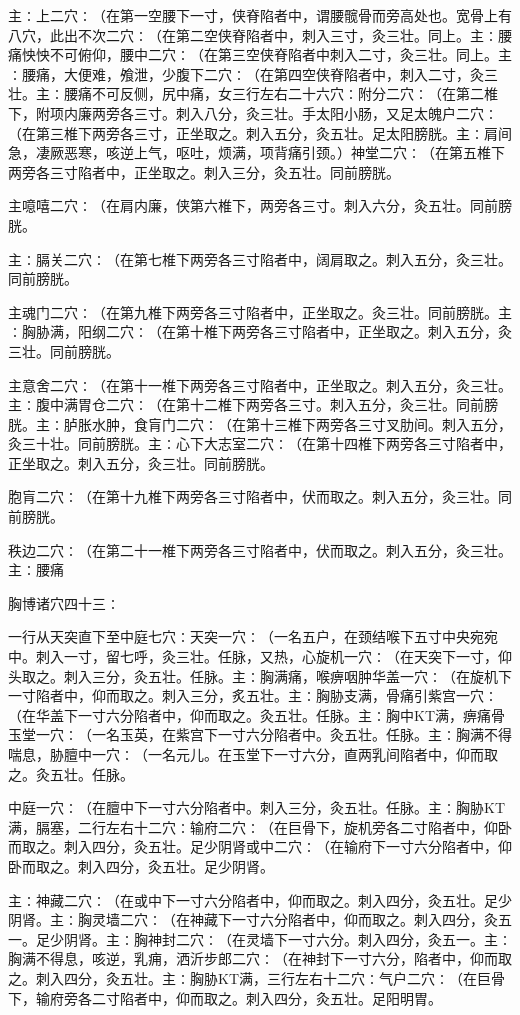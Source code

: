 \documentclass[a4paper,12pt,UTF8,twoside]{ctexbook}
\begin{document}
主∶上二穴∶（在第一空腰下一寸，侠脊陷者中，谓腰髋骨而旁高处也。宽骨上有八穴，此出不次二穴∶（在第二空侠脊陷者中，刺入三寸，灸三壮。同上。主∶腰痛怏怏不可俯仰，腰中二穴∶（在第三空侠脊陷者中刺入二寸，灸三壮。同上。主∶腰痛，大便难，飧泄，少腹下二穴∶（在第四空侠脊陷者中，刺入二寸，灸三壮。主∶腰痛不可反侧，尻中痛，女三行左右二十六穴∶附分二穴∶（在第二椎下，附项内廉两旁各三寸。刺入八分，灸三壮。手太阳小肠，又足太魄户二穴∶（在第三椎下两旁各三寸，正坐取之。刺入五分，灸五壮。足太阳膀胱。主∶肩间急，凄厥恶寒，咳逆上气，呕吐，烦满，项背痛引颈。）神堂二穴∶（在第五椎下两旁各三寸陷者中，正坐取之。刺入三分，灸五壮。同前膀胱。

主噫嘻二穴∶（在肩内廉，侠第六椎下，两旁各三寸。刺入六分，灸五壮。同前膀胱。

主∶膈关二穴∶（在第七椎下两旁各三寸陷者中，阔肩取之。刺入五分，灸三壮。同前膀胱。

主魂门二穴∶（在第九椎下两旁各三寸陷者中，正坐取之。灸三壮。同前膀胱。主∶胸胁满，阳纲二穴∶（在第十椎下两旁各三寸陷者中，正坐取之。刺入五分，灸三壮。同前膀胱。

主意舍二穴∶（在第十一椎下两旁各三寸陷者中，正坐取之。刺入五分，灸三壮。主∶腹中满胃仓二穴∶（在第十二椎下两旁各三寸。刺入五分，灸三壮。同前膀胱。主∶胪胀水肿，食肓门二穴∶（在第十三椎下两旁各三寸叉肋间。刺入五分，灸三十壮。同前膀胱。主∶心下大志室二穴∶（在第十四椎下两旁各三寸陷者中，正坐取之。刺入五分，灸三壮。同前膀胱。

胞肓二穴∶（在第十九椎下两旁各三寸陷者中，伏而取之。刺入五分，灸三壮。同前膀胱。

秩边二穴∶（在第二十一椎下两旁各三寸陷者中，伏而取之。刺入五分，灸三壮。主∶腰痛

胸博诸穴四十三∶

一行从天突直下至中庭七穴∶天突一穴∶（一名五户，在颈结喉下五寸中央宛宛中。刺入一寸，留七呼，灸三壮。任脉，又热，心旋机一穴∶（在天突下一寸，仰头取之。刺入三分，灸五壮。任脉。主∶胸满痛，喉痹咽肿华盖一穴∶（在旋机下一寸陷者中，仰而取之。刺入三分，炙五壮。主∶胸胁支满，骨痛引紫宫一穴∶（在华盖下一寸六分陷者中，仰而取之。灸五壮。任脉。主∶胸中KT满，痹痛骨玉堂一穴∶（一名玉英，在紫宫下一寸六分陷者中。灸五壮。任脉。主∶胸满不得喘息，胁膻中一穴∶（一名元儿。在玉堂下一寸六分，直两乳间陷者中，仰而取之。灸五壮。任脉。

中庭一穴∶（在膻中下一寸六分陷者中。刺入三分，灸五壮。任脉。主∶胸胁KT满，膈塞，二行左右十二穴∶输府二穴∶（在巨骨下，旋机旁各二寸陷者中，仰卧而取之。刺入四分，灸五壮。足少阴肾或中二穴∶（在输府下一寸六分陷者中，仰卧而取之。刺入四分，灸五壮。足少阴肾。

主∶神藏二穴∶（在或中下一寸六分陷者中，仰而取之。刺入四分，灸五壮。足少阴肾。主∶胸灵墙二穴∶（在神藏下一寸六分陷者中，仰而取之。刺入四分，灸五一。足少阴肾。主∶胸神封二穴∶（在灵墙下一寸六分。刺入四分，灸五一。主∶胸满不得息，咳逆，乳痈，洒沂步郎二穴∶（在神封下一寸六分，陷者中，仰而取之。刺入四分，灸五壮。主∶胸胁KT满，三行左右十二穴∶气户二穴∶（在巨骨下，输府旁各二寸陷者中，仰而取之。刺入四分，灸五壮。足阳明胃。
\end{document}
